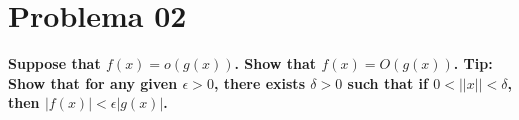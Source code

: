 \section*{Problema 02}

\textbf{Suppose that $f(x)=o(g(x))$. Show that $f(x) = O(g(x))$. Tip: Show that for any given $\epsilon > 0$, there exists $\delta> 0$ such that if $0 < ||x||< \delta$, then $|f(x)|< \epsilon|g(x)|$.}